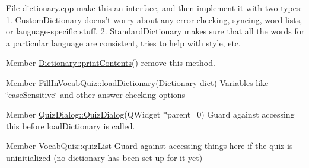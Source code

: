\label{todo__todo000001}
\hypertarget{todo__todo000001}{}
 
\begin{DoxyDescription}
\item[File \hyperlink{dictionary_8cpp}{dictionary.cpp} ]make this an interface, and then implement it with two types: 1. CustomDictionary doens't worry about any error checking, syncing, word lists, or language-\/specific stuff. 2. StandardDictionary makes sure that all the words for a particular language are consistent, tries to help with style, etc. 
\end{DoxyDescription}

\label{todo__todo000002}
\hypertarget{todo__todo000002}{}
 
\begin{DoxyDescription}
\item[Member \hyperlink{classDictionary_a2dbee36571908c93d96cfe885f25272e}{Dictionary::printContents}() ]remove this method. 
\end{DoxyDescription}

\label{todo__todo000007}
\hypertarget{todo__todo000007}{}
 
\begin{DoxyDescription}
\item[Member \hyperlink{classFillInVocabQuiz_affe1c2da58f58e96643a5d95bf3a6e47}{FillInVocabQuiz::loadDictionary}(\hyperlink{classDictionary}{Dictionary} dict) ]Variables like \char`\"{}caseSensitive\char`\"{} and other answer-\/checking options 
\end{DoxyDescription}

\label{todo__todo000004}
\hypertarget{todo__todo000004}{}
 
\begin{DoxyDescription}
\item[Member \hyperlink{classQuizDialog_a705eca03231d2f3c68f93692b1854f7e}{QuizDialog::QuizDialog}(QWidget $\ast$parent=0) ]Guard against accessing this before loadDictionary is called. 
\end{DoxyDescription}

\label{todo__todo000006}
\hypertarget{todo__todo000006}{}
 
\begin{DoxyDescription}
\item[Member \hyperlink{classVocabQuiz_a294e44914f7766a1cdfff9ae87c722ff}{VocabQuiz::quizList} ]Guard against accessing things here if the quiz is uninitialized (no dictionary has been set up for it yet) 
\end{DoxyDescription}